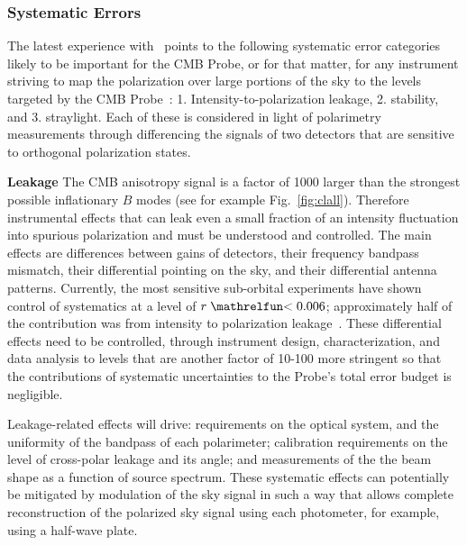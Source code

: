
\subsubsection{Systematic Errors}
\vspace{-0.05in}

The latest experience with \planck\ points to the following systematic error categories likely to be important for 
the CMB Probe, or for that matter, for any instrument striving to map the polarization 
over large portions of the sky to the levels targeted by the CMB Probe~\cite{planck2016_xlvi}:
1. Intensity-to-polarization leakage, 2. stability, and 3. straylight. 
Each of these is considered in light of polarimetry measurements through
differencing the signals of two detectors that are sensitive to orthogonal polarization states. 

\textbf{Leakage} \hspace{0.1in} The CMB anisotropy signal is a factor of 1000 larger 
than the strongest possible inflationary $B$ modes (see for example Fig.~\ref{fig:clall}). 
Therefore instrumental effects that can leak
even a small fraction of an intensity fluctuation into spurious polarization and must be understood and controlled. The main effects are differences between gains of detectors, 
their frequency bandpass mismatch, their differential pointing on the sky, 
and their differential antenna patterns. Currently, the most sensitive sub-orbital 
experiments have shown control of systematics at a level of $r\simlt0.006$; 
approximately half of the contribution was from intensity to polarization leakage~\cite{bicep1502.00608}. 
These differential effects need to be controlled, through 
instrument design, characterization, and data analysis to levels that are another 
factor of 10-100 more stringent so that the contributions of systematic uncertainties
to the Probe's total error budget is negligible.   

Leakage-related effects will drive: requirements on the optical system, and the uniformity of the
bandpass of each polarimeter;  calibration requirements on the level of cross-polar leakage and its angle; 
and measurements of the the beam shape as a function of source spectrum. 
These systematic effects can potentially be mitigated by modulation of the sky signal in
such a way that allows complete reconstruction of the 
polarized sky signal using each photometer, for example, using a
half-wave plate.  


